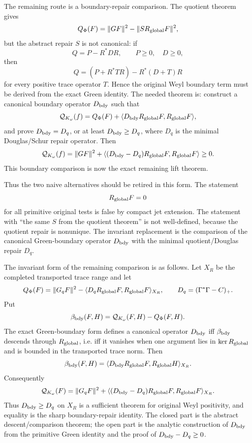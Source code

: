 \documentclass[11pt]{article}
\begin{document}
The remaining route is a boundary-repair comparison.  The quotient theorem
gives
\[
  Q_\Phi(F)=\|GF\|^2-\|S R_{\rm global}F\|^2,
\]
but the abstract repair \(S\) is not canonical: if
\[
  Q=P-R^\ast D R,\qquad P\ge0,\quad D\ge0,
\]
then
\[
  Q=(P+R^\ast T R)-R^\ast(D+T)R
\]
for every positive trace operator \(T\).  Hence the original Weyl boundary term
must be derived from the exact Green identity.  The needed theorem is:
construct a canonical boundary operator \(D_{\rm bdy}\) such that
\[
  \mathcal Q_{K_\omega}(f)
  =
  Q_\Phi(F)+\langle D_{\rm bdy}R_{\rm global}F,R_{\rm global}F\rangle,
\]
and prove \(D_{\rm bdy}=D_q\), or at least \(D_{\rm bdy}\ge D_q\), where
\(D_q\) is the minimal Douglas/Schur repair operator.  Then
\[
  \mathcal Q_{K_\omega}(f)
  =
  \|GF\|^2+
  \langle (D_{\rm bdy}-D_q)R_{\rm global}F,
          R_{\rm global}F\rangle
  \ge0.
  \]
This boundary comparison is now the exact remaining lift theorem.

Thus the two naive alternatives should be retired in this form.  The statement
\[
  R_{\rm global}F=0
\]
for all primitive original tests is false by compact jet extension.  The
statement with ``the same \(S\) from the quotient theorem'' is not well-defined,
because the quotient repair is nonunique.  The invariant replacement is the
comparison of the canonical Green-boundary operator \(D_{\rm bdy}\) with the
minimal quotient/Douglas repair \(D_q\).

The invariant form of the remaining comparison is as follows.  Let \(X_R\) be
the completed transported trace range and let
\[
  Q_\Phi(F)=\|G_qF\|^2-\langle D_qR_{\rm global}F,
  R_{\rm global}F\rangle_{X_R},
  \qquad
  D_q=(\Gamma^\ast\Gamma-C)_+ .
\]
Put
\[
  \beta_{\rm bdy}(F,H)
  =\mathcal Q_{K_\omega}(F,H)-Q_\Phi(F,H).
\]
The exact Green-boundary form defines a canonical operator \(D_{\rm bdy}\) iff
\(\beta_{\rm bdy}\) descends through \(R_{\rm global}\), i.e. iff it vanishes
when one argument lies in \(\ker R_{\rm global}\) and is bounded in the
transported trace norm.  Then
\[
  \beta_{\rm bdy}(F,H)
  =
  \langle D_{\rm bdy}R_{\rm global}F,
          R_{\rm global}H\rangle_{X_R}.
\]
Consequently
\[
  \mathcal Q_{K_\omega}(F)
  =
  \|G_qF\|^2+
  \langle (D_{\rm bdy}-D_q)R_{\rm global}F,
          R_{\rm global}F\rangle_{X_R}.
\]
Thus \(D_{\rm bdy}\ge D_q\) on \(X_R\) is a sufficient theorem for original
Weyl positivity, and equality is the sharp boundary-repair identity.  The
closed part is the abstract descent/comparison theorem; the open part is the
analytic construction of \(D_{\rm bdy}\) from the primitive Green identity and
the proof of \(D_{\rm bdy}-D_q\ge0\).
\end{document}
